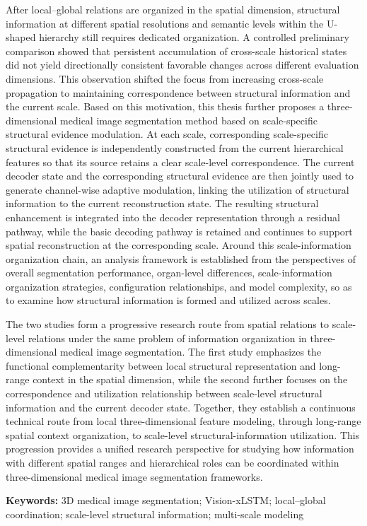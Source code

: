 After local--global relations are organized in the spatial dimension, structural information at different spatial resolutions and semantic levels within the U-shaped hierarchy still requires dedicated organization. A controlled preliminary comparison showed that persistent accumulation of cross-scale historical states did not yield directionally consistent favorable changes across different evaluation dimensions. This observation shifted the focus from increasing cross-scale propagation to maintaining correspondence between structural information and the current scale. Based on this motivation, this thesis further proposes a three-dimensional medical image segmentation method based on scale-specific structural evidence modulation. At each scale, corresponding scale-specific structural evidence is independently constructed from the current hierarchical features so that its source retains a clear scale-level correspondence. The current decoder state and the corresponding structural evidence are then jointly used to generate channel-wise adaptive modulation, linking the utilization of structural information to the current reconstruction state. The resulting structural enhancement is integrated into the decoder representation through a residual pathway, while the basic decoding pathway is retained and continues to support spatial reconstruction at the corresponding scale. Around this scale-information organization chain, an analysis framework is established from the perspectives of overall segmentation performance, organ-level differences, scale-information organization strategies, configuration relationships, and model complexity, so as to examine how structural information is formed and utilized across scales.

The two studies form a progressive research route from spatial relations to scale-level relations under the same problem of information organization in three-dimensional medical image segmentation. The first study emphasizes the functional complementarity between local structural representation and long-range context in the spatial dimension, while the second further focuses on the correspondence and utilization relationship between scale-level structural information and the current decoder state. Together, they establish a continuous technical route from local three-dimensional feature modeling, through long-range spatial context organization, to scale-level structural-information utilization. This progression provides a unified research perspective for studying how information with different spatial ranges and hierarchical roles can be coordinated within three-dimensional medical image segmentation frameworks.

\noindent\textbf{Keywords:} 3D medical image segmentation; Vision-xLSTM; local--global coordination; scale-level structural information; multi-scale modeling
